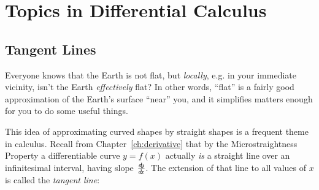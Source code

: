 \chapter{Topics in Differential Calculus}\label{ch:topics-in-differential-calculus}
\section{Tangent Lines}\label{sec:tangent-lines}
Everyone knows that the Earth is not flat, but \emph{locally}, e.g. in your
immediate vicinity, isn't the Earth \emph{effectively} flat? In other words,
``flat'' is a fairly good approximation of the Earth's surface ``near'' you,
and it simplifies matters enough for you to do some useful things.

This idea of approximating curved shapes by straight shapes is a frequent theme
in calculus. Recall from Chapter~\ref{ch:derivative} that by the Microstraightness Property a
differentiable curve $y = f(x)$ actually \emph{is} a straight line over an
infinitesimal interval, having slope $\frac{d\negmedspace y}{d\!x}$. The extension of that line to all
values of $x$ is called the
\emph{tangent line}:


